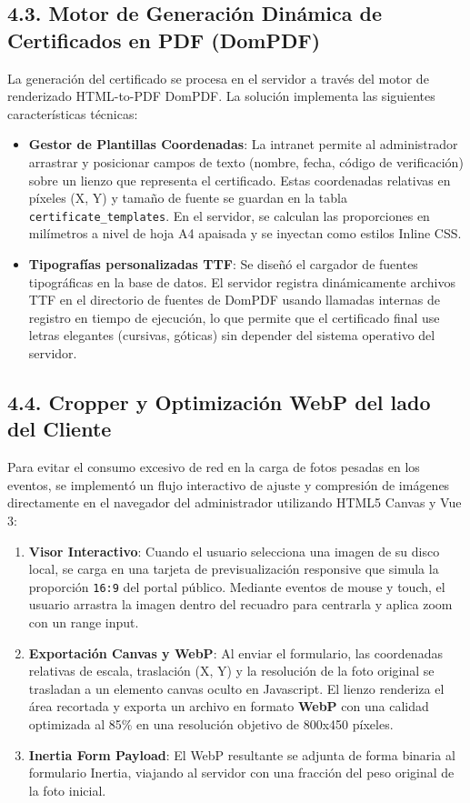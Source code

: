 \documentclass[11pt,a4paper]{article}
\begin{document}
\subsection*{4.3. Motor de Generación Dinámica de Certificados en PDF (DomPDF)}
La generación del certificado se procesa en el servidor a través del motor de renderizado HTML-to-PDF DomPDF. La solución implementa las siguientes características técnicas:
\begin{itemize}
    \item \textbf{Gestor de Plantillas Coordenadas}: La intranet permite al administrador arrastrar y posicionar campos de texto (nombre, fecha, código de verificación) sobre un lienzo que representa el certificado. Estas coordenadas relativas en píxeles (X, Y) y tamaño de fuente se guardan en la tabla \texttt{certificate\_templates}. En el servidor, se calculan las proporciones en milímetros a nivel de hoja A4 apaisada y se inyectan como estilos Inline CSS.
    \item \textbf{Tipografías personalizadas TTF}: Se diseñó el cargador de fuentes tipográficas en la base de datos. El servidor registra dinámicamente archivos TTF en el directorio de fuentes de DomPDF usando llamadas internas de registro en tiempo de ejecución, lo que permite que el certificado final use letras elegantes (cursivas, góticas) sin depender del sistema operativo del servidor.
\end{itemize}

\subsection*{4.4. Cropper y Optimización WebP del lado del Cliente}
Para evitar el consumo excesivo de red en la carga de fotos pesadas en los eventos, se implementó un flujo interactivo de ajuste y compresión de imágenes directamente en el navegador del administrador utilizando HTML5 Canvas y Vue 3:
\begin{enumerate}
    \item \textbf{Visor Interactivo}: Cuando el usuario selecciona una imagen de su disco local, se carga en una tarjeta de previsualización responsive que simula la proporción \texttt{16:9} del portal público. Mediante eventos de mouse y touch, el usuario arrastra la imagen dentro del recuadro para centrarla y aplica zoom con un range input.
    \item \textbf{Exportación Canvas y WebP}: Al enviar el formulario, las coordenadas relativas de escala, traslación (X, Y) y la resolución de la foto original se trasladan a un elemento canvas oculto en Javascript. El lienzo renderiza el área recortada y exporta un archivo en formato \textbf{WebP} con una calidad optimizada al 85\% en una resolución objetivo de 800x450 píxeles.
    \item \textbf{Inertia Form Payload}: El WebP resultante se adjunta de forma binaria al formulario Inertia, viajando al servidor con una fracción del peso original de la foto inicial.
\end{enumerate}
\end{document}
